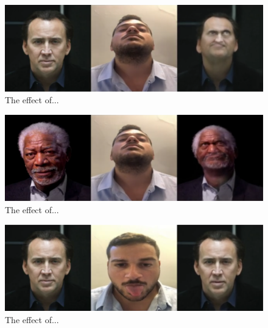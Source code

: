 \documentclass[english,12pt]{article}
\begin{document}
\begin{figure}[htb]
  \begin{centering}
      \includegraphics[scale=0.29]{images/‏‏Amit_tilt_cage.PNG}
  \par\end{centering}
  \caption{\label{fig:Amit_tilt_cage}The effect of...}
\end{figure}

\begin{figure}[htb]
  \begin{centering}
      \includegraphics[scale=0.29]{images/‏‏Amit_tilt_freeman.PNG}
  \par\end{centering}
  \caption{\label{fig:Amit_tilt_freeman}The effect of...}
\end{figure}

\begin{figure}[htb]
  \begin{centering}
      \includegraphics[scale=0.29]{images/‏‏Amit_tongue_cage.PNG}
  \par\end{centering}
  \caption{\label{fig:Amit_tongue_cage}The effect of...}
\end{figure}
\end{document}
